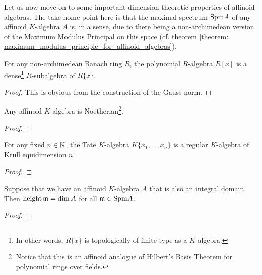             Let us now move on to some important dimension-theoretic properties of affinoid algebras. The take-home point here is that the maximal spectrum $\mathrm{Spm} A$ of any affinoid $K$-algebra $A$ is, in a sense,  due to there being a non-archimedean version of the Maximum Modulus Principal on this space (cf. theorem \ref{theorem: maximum_modulus_principle_for_affinoid_algebras}).
            \begin{lemma} \label{lemma: tate_algebras_are_topologically_of_finite_type}
                For any non-archimedean Banach ring $R$, the polynomial $R$-algebra $R[x]$ is a dense\footnote{In other words, $R\{x\}$ is topologically of finite type as a $K$-algebra.} $R$-subalgebra of $R\{x\}$.
            \end{lemma}
                \begin{proof}
                    This is obvious from the construction of the Gauss norm.
                \end{proof}
            \begin{theorem} \label{theorem: affinoid_algebras_are_noetherian}
                Any affinoid $K$-algebra is Noetherian\footnote{Notice that this is an affinoid analogue of Hilbert's Basis Theorem for polynomial rings over fields.}.
            \end{theorem}
                \begin{proof}
                
                \end{proof}
            \begin{lemma} \label{lemma: tate_algebras_over_non_archimedean_fields_are_regular}
                For any fixed $n \in \mathbb{N}$, the Tate $K$-algebra $K\{x_1, ..., x_n\}$ is a regular $K$-algebra of Krull equidimension $n$. 
            \end{lemma}
                \begin{proof}
                    
                \end{proof}
            \begin{corollary}
                Suppose that we have an affinoid $K$-algebra $A$ that is also an integral domain. Then $\operatorname{height} \mathfrak{m} = \dim A$ for all $\mathfrak{m} \in \mathrm{Spm} A$.
            \end{corollary}
                \begin{proof}
                    
                \end{proof}
